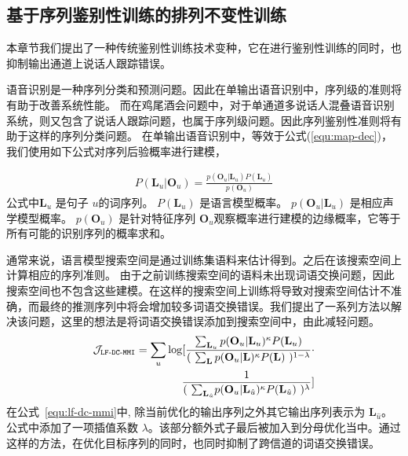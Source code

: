 \subsection{基于序列鉴别性训练的排列不变性训练}
\label{chap:intro2-pit-dt}

本章节我们提出了一种传统鉴别性训练技术变种，它在进行鉴别性训练的同时，也抑制输出通道上说话人跟踪错误。

语音识别是一种序列分类和预测问题。因此在单输出语音识别中，序列级的准则将有助于改善系统性能。
而在鸡尾酒会问题中，对于单通道多说话人混叠语音识别系统，则又包含了说话人跟踪问题，也属于序列级问题。因此序列鉴别性准则将有助于这样的序列分类问题。
在单输出语音识别中，等效于公式(\ref{equ:map-dec})，我们使用如下公式对序列后验概率进行建模，

  
\begin{equation}
\label{equ:single-mbr}
\begin{split}
P(\mathbf{L}_u|\mathbf{O}_u)=\frac {p(\mathbf{O}_u|\mathbf{L}_u)P(\mathbf{L}_u)}{p(\mathbf{O}_u)}  
\end{split}
\end{equation}
公式中$\mathbf{L}_u$ 是句子 $u$的词序列。 $P(\mathbf{L}_u)$ 是语言模型概率。
$p(\mathbf{O}_u|\mathbf{L}_u)$ 是相应声学模型概率。
 $p(\mathbf{O}_u)$ 是针对特征序列 $\mathbf{O}_u$观察概率进行建模的边缘概率，它等于所有可能的识别序列的概率求和。

通常来说，语言模型搜索空间是通过训练集语料来估计得到。之后在该搜索空间上计算相应的序列准则。 
由于之前训练搜索空间的语料未出现词语交换问题，因此搜索空间也不包含这些建模。在这样的搜索空间上训练将导致对搜索空间估计不准确，而最终的推测序列中将会增加较多词语交换错误。我们提出了一系列方法以解决该问题，这里的想法是将词语交换错误添加到搜索空间中，由此减轻问题。
\begin{equation}
\label{equ:lf-dc-mmi}
\begin{split}
\mathcal{J}_{\tt{LF\text{-}DC\text{-}MMI}}
=\sum_{u} \log  [ \frac {\sum_{\mathbf{L}_u} p(\mathbf{O}_u|\mathbf{L}_u)^{\kappa}P(\mathbf{L}_u)}{(\ \sum_{\mathbf{L}} p(\mathbf{O}_u|\mathbf{L})^{\kappa}P(\mathbf{L})\ )^{1-\lambda} } 
\cdot \\ 
\frac{1} {(\ {\sum_{\mathbf{L}_{\hat{u}}}} p(\mathbf{O}_u|{\mathbf{L}_{\hat{u}}})^{\kappa}P({\mathbf{L}_{\hat{u}}})\ )^\lambda}
 ]
\end{split}
\end{equation}
在公式~\ref{equ:lf-dc-mmi}中, 除当前优化的输出序列之外其它输出序列表示为 $\mathbf{L}_{\hat{u}}$。公式中添加了一项插值系数 $\lambda$。该部分额外式子最后被加入到分母优化当中。通过这样的方法，在优化目标序列的同时，也同时抑制了跨信道的词语交换错误。


